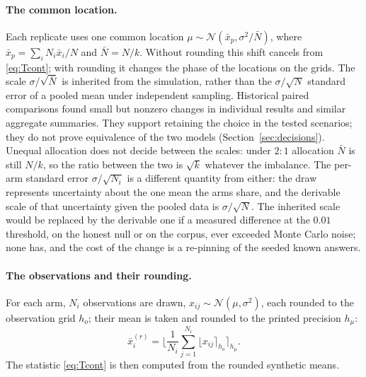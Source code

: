 \documentclass[11pt,a4paper]{article}
\begin{document}
\paragraph{The common location.} Each replicate uses one common location $\mu\sim\mathcal N(\bar x_p,\sigma^2/\bar N)$, where $\bar x_p=\sum_iN_i\bar x_i/N$ and $\bar N=N/k$. Without rounding this shift cancels from \eqref{eq:Tcont}; with rounding it changes the phase of the locations on the grids. The scale $\sigma/\sqrt{\bar N}$ is inherited from the simulation, rather than the $\sigma/\sqrt N$ standard error of a pooled mean under independent sampling. Historical paired comparisons found small but nonzero changes in individual results and similar aggregate summaries. They support retaining the choice in the tested scenarios; they do not prove equivalence of the two models (Section~\ref{sec:decisions}). Unequal allocation does not decide between the scales: under $2{:}1$ allocation $\bar N$ is still $N/k$, so the ratio between the two is $\sqrt{k}$ whatever the imbalance. The per-arm standard error $\sigma/\sqrt{N_i}$ is a different quantity from either: the draw represents uncertainty about the one mean the arms share, and the derivable scale of that uncertainty given the pooled data is $\sigma/\sqrt N$. The inherited scale would be replaced by the derivable one if a measured difference at the $0.01$ threshold, on the honest null or on the corpus, ever exceeded Monte Carlo noise; none has, and the cost of the change is a re-pinning of the seeded known answers.

\paragraph{The observations and their rounding.} For each arm, $N_i$ observations are drawn, $x_{ij} \sim \mathcal{N}(\mu, \sigma^2)$, each rounded to the observation grid $h_o$; their mean is taken and rounded to the printed precision $h_{\mu}$:
\begin{equation}
\bar{x}_i^{(r)} = \Big\lfloor \frac{1}{N_i}\sum_{j=1}^{N_i} \lfloor x_{ij} \rceil_{h_o} \Big\rceil_{h_\mu}.
\end{equation}
The statistic \eqref{eq:Tcont} is then computed from the rounded synthetic means.
\end{document}
